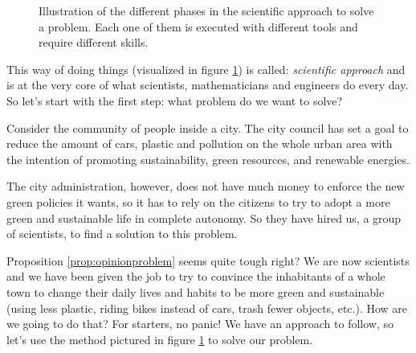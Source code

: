 %
\begin{figure}[b]
\centering
\sidecaption

%
%
\caption{Illustration of the different phases in the scientific approach to solve a problem.
Each one of them is executed with different tools and require different skills.}
\label{fig:sciappr}
\end{figure}
%

This way of doing things (visualized in figure \ref{fig:sciappr})
is called: \textit{scientific approach} and is at the very core
of what scientists, mathematicians and engineers do every day. So let's start
with the first step: what problem do we want to solve?

\begin{proposition}
\label{prop:opinionproblem}
Consider the community of people inside a city. The city council has set a goal to reduce
the amount of cars, plastic and pollution on the whole urban area with the intention of
promoting sustainability, green resources, and renewable energies.

The city administration, however, does not have much money to enforce the new green policies
it wants, so it has to rely on the citizens to try to adopt a more green and sustainable life
in complete autonomy. So they have hired us, a group of scientists, to find a solution to
this problem.
\end{proposition}

Proposition \ref{prop:opinionproblem} seems quite tough right? We are now scientists and we
have been given the job to try to convince the inhabitants of a whole town to change their
daily lives and habits to be more green and sustainable (using less plastic, riding bikes instead of
cars, trash fewer objects, etc.). How are we going to do that?
For starters, no panic! We have an approach to follow, so let's use the method pictured in figure
\ref{fig:sciappr} to solve our problem.\\

